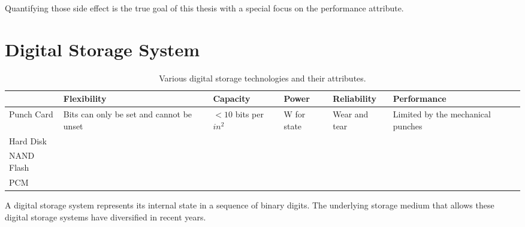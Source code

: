 Quantifying those side effect is the true goal of this thesis with a special focus on the performance attribute.

\section{Digital Storage System}
\begin{table}[t]
\centering
\begin{tabular}{p{1.3cm}||p{2.1cm}|p{2.1cm}|p{2.1cm}|p{2.1cm}|p{2.1cm}}
\hline
\hline
 			& Flexibility & Capacity & Power & Reliability & Performance \\
\hline
\hline
Punch Card		& \raggedright Bits can only be set and cannot be unset
							&	\raggedright $<10$ bits per $in^2$
							&	\raggedright W for state 
							&	\raggedright Wear and tear 
							&	\raggedright Limited by the mechanical punches \\
\hline
Hard Disk			& & & & & \\
\hline
NAND Flash		&	&	&	&	&	\\
\hline
PCM						&	&	&	&	&	\\
\hline
\hline
\end{tabular}
\caption{Various digital storage technologies and their attributes.}
\label{tbl:medium}
\end{table}
A digital storage system represents its internal state in a sequence of binary digits. 
The underlying storage medium that allows these digital storage systems have diversified in recent years. 


